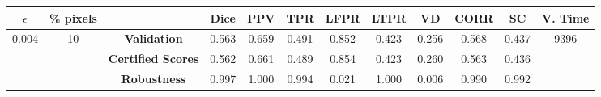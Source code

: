 \begin{longtable}{ c  c | c | c  c  c  c  c  c  c c c}
\toprule \textbf{$\epsilon$} & \textbf{\% pixels} & & \textbf{Dice} & \textbf{PPV} & \textbf{TPR} & \textbf{LFPR} & \textbf{LTPR} & \textbf{VD} & \textbf{CORR} & \textbf{SC} & \textbf{V. Time} \\
\midrule 
\multirow{3}{*}{0.004}  & \multirow{3}{*}{10} &\textbf{Validation} & 0.563 & 0.659 & 0.491 & 0.852 & 0.423 & 0.256 & 0.568 & 0.437 & \multirow{3}{*}{9396} \\
 & & \textbf{Certified Scores} & 0.562 & 0.661 & 0.489 & 0.854 & 0.423 & 0.260 & 0.563 & 0.436 & \\
& & \textbf{Robustness} & 0.997 & 1.000 & 0.994 & 0.021 & 1.000 & 0.006 & 0.990 & 0.992 & \\
\end{longtable}